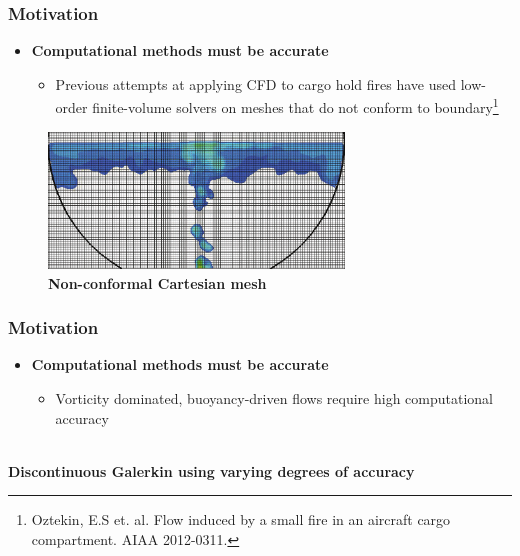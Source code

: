 \documentclass[9pt]{beamer}
\begin{document}
\begin{frame}
\frametitle{Motivation}
\label{sec-5-5}

\begin{itemize}
\item \textbf{Computational methods must be accurate}
\begin{itemize}
\item Previous attempts at applying CFD to cargo hold fires have used
    low-order finite-volume solvers on meshes that do not conform to
    boundary\footnote{Oztekin, E.S et. al. Flow induced by a small fire in
an aircraft cargo compartment. AIAA 2012-0311.
 }
\end{itemize}
\end{itemize}
\centering
\begin{figure}[ht]
\includegraphics[width=0.7\textwidth]{CutCellGeometry.png} \\
\textbf{Non-conformal Cartesian mesh}
\end{figure}
\end{frame}
\begin{frame}
\frametitle{Motivation}
\label{sec-5-6}

\begin{itemize}
\item \textbf{Computational methods must be accurate}
\begin{itemize}
\item Vorticity dominated, buoyancy-driven flows require high
    computational accuracy
\end{itemize}
\end{itemize}
\centering
{} \\
\textbf{Discontinuous Galerkin using varying degrees of accuracy}
\end{frame}
\end{document}

